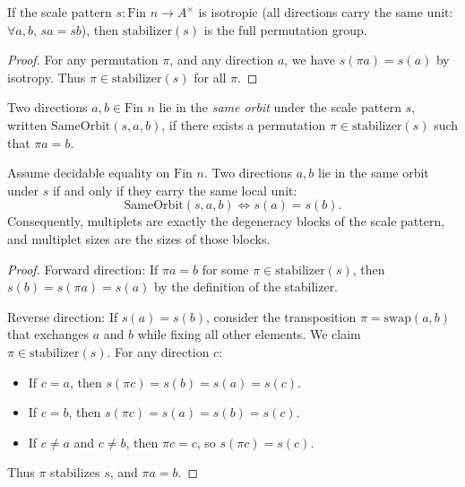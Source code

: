 \begin{theorem}
If the scale pattern $s : \text{Fin } n \to A^\times$ is isotropic (all directions carry the same unit: $\forall a, b, \, s a = s b$), then $\mathrm{stabilizer}(s)$ is the full permutation group.
\end{theorem}

\begin{proof}
For any permutation $\pi$, and any direction $a$, we have $s(\pi a) = s(a)$ by isotropy. Thus $\pi \in \mathrm{stabilizer}(s)$ for all $\pi$.
\end{proof}

\begin{definition}
Two directions $a, b \in \text{Fin } n$ lie in the \emph{same orbit} under the scale pattern $s$, written $\mathrm{SameOrbit}(s, a, b)$, if there exists a permutation $\pi \in \mathrm{stabilizer}(s)$ such that $\pi a = b$.
\end{definition}

\begin{theorem}
Assume decidable equality on $\text{Fin } n$. Two directions $a, b$ lie in the same orbit under $s$ if and only if they carry the same local unit:
\[ \mathrm{SameOrbit}(s, a, b) \iff s(a) = s(b). \]
Consequently, multiplets are exactly the degeneracy blocks of the scale pattern, and multiplet sizes are the sizes of those blocks.
\end{theorem}

\begin{proof}
Forward direction: If $\pi a = b$ for some $\pi \in \mathrm{stabilizer}(s)$, then $s(b) = s(\pi a) = s(a)$ by the definition of the stabilizer.

Reverse direction: If $s(a) = s(b)$, consider the transposition $\pi = \mathrm{swap}(a, b)$ that exchanges $a$ and $b$ while fixing all other elements. We claim $\pi \in \mathrm{stabilizer}(s)$. For any direction $c$:
\begin{itemize}
\item If $c = a$, then $s(\pi c) = s(b) = s(a) = s(c)$.
\item If $c = b$, then $s(\pi c) = s(a) = s(b) = s(c)$.
\item If $c \neq a$ and $c \neq b$, then $\pi c = c$, so $s(\pi c) = s(c)$.
\end{itemize}
Thus $\pi$ stabilizes $s$, and $\pi a = b$.
\end{proof}

